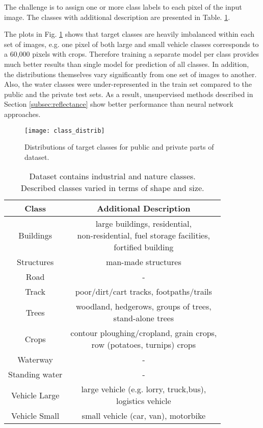 \documentclass[10pt,twocolumn,letterpaper]{article}
\begin{document}
The challenge is to assign one or more class labels to each pixel of the input image. The classes with additional description are presented in Table. \ref{tab:classes}. 

The plots in Fig. \ref{fig:cls_distr} shows that target classes are heavily imbalanced within each set of images, e.g. one pixel of both large and small vehicle classes corresponds to a 60,000 pixels with crops. Therefore training a separate model per class provides much better results than single model for prediction of all classes. In addition, the distributions themselves vary significantly from one set of images to another. Also, the water classes were under-represented in the train set compared to the public and the private test sets. As a result, unsupervised methods described in Section \ref{subsec:reflectance} show better performance than neural network approaches. 

\begin{figure}[!h]
	\captionsetup{justification=centering}
	\centering
	\texttt{[image: class\_distrib]}
	\caption{ Distributions of target classes for public and private parts of dataset.}
	\label{fig:cls_distr}
\end{figure}

\begin{table}[h!]
	\begin{center}
		\captionsetup{justification=centering}
		\begin{tabular}{|c|c|}
			\hline
			\textbf{Class}    & \textbf{Additional Description} \\ \hline 
			Buildings      &  \makecell{large buildings, residential, \\ non-residential, fuel storage facilities, \\ fortified building} \\ \hline
			Structures     &  man-made structures	  \\ \hline
			Road           &  	 -  \\ \hline
			Track          & poor/dirt/cart tracks, footpaths/trails	  \\ \hline
			Trees 	       &   \makecell{woodland, hedgerows, groups of trees, \\ stand-alone trees}	  \\ \hline
			Crops 	       &  \makecell{contour ploughing/cropland, grain crops, \\ row (potatoes, turnips) crops}   \\ \hline
			Waterway       &   -   \\ \hline
			Standing water &   -   \\ \hline
			Vehicle Large  & \makecell{large vehicle (e.g. lorry, truck,bus), \\ logistics vehicle}      \\ \hline
			Vehicle Small  &  small vehicle (car, van), motorbike    \\ \hline
		\end{tabular}
		\caption{Dataset contains  industrial and nature classes. \\ Described classes varied in terms of shape and size.}\label{tab:classes}
	\end{center}	
\end{table}
\end{document}
